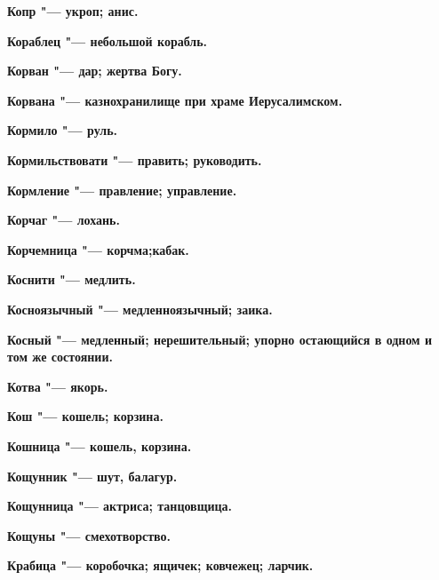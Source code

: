 \bfseries Копр \normalfont{} "--- укроп; анис. 




\bfseries Кораблец \normalfont{} "--- небольшой корабль. 




\bfseries Корван \normalfont{} "--- дар; жертва Богу. 




\bfseries Корвана \normalfont{} "--- казнохранилище при храме Иерусалимском. 




\bfseries Кормило \normalfont{} "--- руль. 




\bfseries Кормильствовати \normalfont{} "--- править; руководить. 




\bfseries Кормление \normalfont{} "--- правление; управление. 




\bfseries Корчаг \normalfont{} "--- лохань. 




\bfseries Корчемница \normalfont{} "--- корчма;кабак. 




\bfseries Коснити \normalfont{} "--- медлить. 




\bfseries Косноязычный \normalfont{} "--- медленноязычный; заика. 




\bfseries Косный \normalfont{} "--- медленный; нерешительный; упорно остающийся в одном и том же состоянии. 




\bfseries Котва \normalfont{} "--- якорь. 




\bfseries Кош \normalfont{} "--- кошель; корзина. 




\bfseries Кошница \normalfont{} "--- кошель, корзина. 




\bfseries Кощунник \normalfont{} "--- шут, балагур. 




\bfseries Кощунница \normalfont{} "--- актриса; танцовщица. 




\bfseries Кощуны \normalfont{} "--- смехотворство. 




\bfseries Крабица \normalfont{} "--- коробочка; ящичек; ковчежец; ларчик. 




